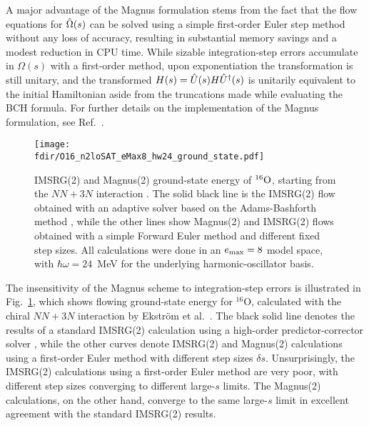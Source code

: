 {A major advantage of the Magnus formulation stems from the fact that the 
flow equations for $\OmegaO(s)$ can be solved using a simple first-order 
Euler step method without any loss of accuracy, resulting in substantial 
memory savings and a modest reduction in CPU time.  While sizable 
integration-step errors accumulate in $\Omega(s)$ with a first-order method, 
upon exponentiation the transformation is still unitary, and the transformed 
$H(s)=\UO(s)H\UUO(s)$ is unitarily equivalent to the initial Hamiltonian aside 
from the truncations made while evaluating the BCH formula. For further details 
on the implementation of the Magnus formulation, see Ref.~\cite{Morris:2015ve}.

\begin{figure}[t]
  \begin{center}
    \texttt{[image: \\fdir/O16\_n2loSAT\_eMax8\_hw24\_ground\_state.pdf]}
  \end{center}
  \caption{\label{fig:timestep_O16}
    IMSRG(2) and Magnus(2) ground-state energy of $\nuc{O}{16}$, 
    starting from the \NNLOsat{} $NN+3N$ interaction \cite{Ekstrom:2015fk}. The 
    solid black line is the IMSRG(2) flow obtained with
    an adaptive solver based on the Adams-Bashforth method \cite{Radhakrishnan:1993fk}, 
    while the other lines show Magnus(2) and IMSRG(2) flows 
    obtained with a simple Forward Euler method and different 
    fixed step sizes. All calculations were done in an
    $\eMax=8$ model space, with $\hbar\omega = 24$~MeV for the
    underlying harmonic-oscillator basis.}
\end{figure}

The insensitivity of the Magnus scheme to integration-step errors is illustrated 
in Fig.~\ref{fig:timestep_O16}, which shows flowing ground-state energy for 
$^{16}$O, calculated with the chiral \NNLOsat{} $NN+3N$ 
interaction by Ekstr\"{o}m et al.~\cite{Ekstrom:2015fk}. The black solid line 
denotes the results of a standard IMSRG(2) calculation using a high-order 
predictor-corrector solver \cite{Hindmarsh:1983pd,Hindmarsh:2005kl}, while the 
other curves denote IMSRG(2) and Magnus(2) calculations using a first-order Euler 
method with different step sizes $\delta s$. Unsurprisingly, the IMSRG(2) calculations 
using a first-order Euler method are very poor, with different step sizes
converging to different large-$s$ limits. The Magnus(2) calculations,
on the other hand, converge to the same large-$s$ limit in excellent
agreement with the standard IMSRG(2) results.

}
